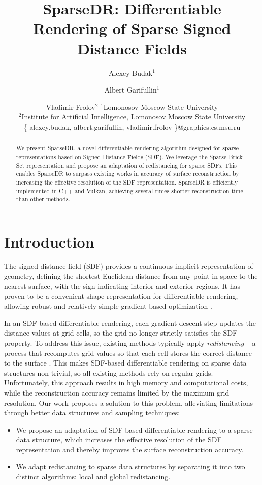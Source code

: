 \documentclass{article}
\title{SparseDR: Differentiable Rendering of Sparse Signed Distance Fields}
\author{
Alexey Budak$^{1}$
\and
Albert Garifullin$^1$\and
Vladimir Frolov$^{2}$
\affiliations
$^1$Lomonosov Moscow State University\\
$^2$Institute for Artificial Intelligence, Lomonosov Moscow State University\\
\emails %
\{ alexey.budak, albert.garifullin, vladimir.frolov \}@graphics.cs.msu.ru
}
\begin{document}
\maketitle

\begin{abstract}
    We present SparseDR, a novel differentiable rendering algorithm designed for sparse representations based on Signed Distance Fields (SDF). We leverage the Sparse Brick Set representation and propose an adaptation of redistancing for sparse SDFs. This enables SparseDR to surpass existing works in accuracy of surface reconstruction by increasing the effective resolution of the SDF representation. SparseDR is efficiently implemented in C++ and Vulkan, achieving several times shorter reconstruction time than other methods.
\end{abstract}

\section{Introduction}

The signed distance field (SDF) provides a continuous implicit representation of geometry, defining the shortest Euclidean distance from any point in space to the nearest surface, with the sign indicating interior and exterior regions. It has proven to be a convenient shape representation for differentiable rendering, allowing robust and relatively simple gradient-based optimization \cite{DRSDF24}.
  
  In an SDF-based differentiable rendering, each gradient descent step updates the distance values at grid cells, so the grid no longer strictly satisfies the SDF property. To address this issue, existing methods typically apply \textit{redistancing} -- a process that recomputes grid values so that each cell stores the correct distance to the surface \cite{DETRIXHE201346}. This makes SDF-based differentiable rendering on sparse data structures non-trivial, so all existing methods rely on regular grids. Unfortunately, this approach results in high memory and computational costs, while the reconstruction accuracy remains limited by the maximum grid resolution. Our work proposes a solution to this problem, alleviating limitations through better data structures and sampling techniques: 
  
  \begin{itemize}
      \item We propose an adaptation of SDF-based differentiable rendering to a sparse
      data structure, which increases the effective resolution of the SDF representation
      and thereby improves the surface reconstruction accuracy.
      \item We adapt redistancing to sparse data structures by separating it into two distinct algorithms: local and global redistancing.  
  \end{itemize}
\end{document}
